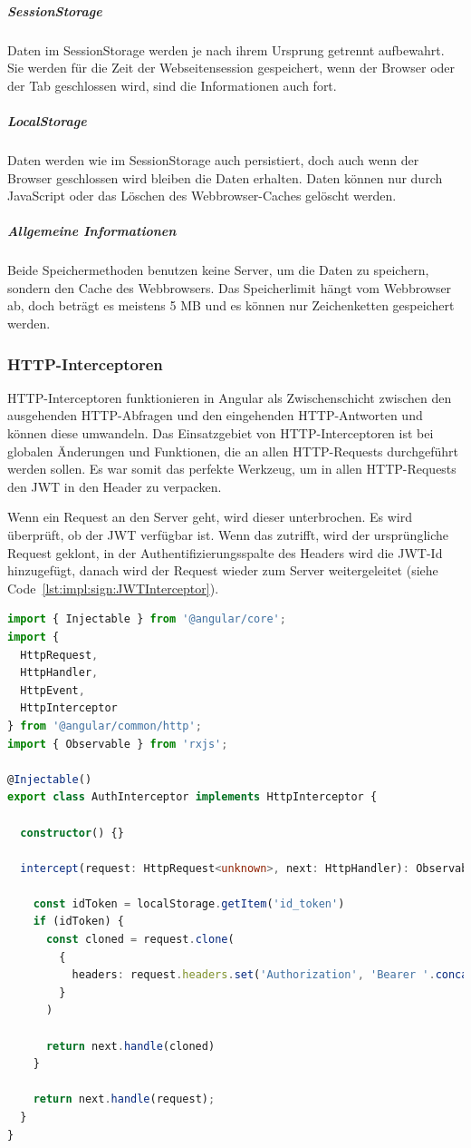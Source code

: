 \subparagraph{SessionStorage}
Daten im SessionStorage werden je nach ihrem Ursprung getrennt aufbewahrt. Sie werden für die Zeit der Webseitensession gespeichert, wenn der Browser oder der Tab geschlossen wird, sind die Informationen auch fort.
\cite{WebStorageAPI}

\subparagraph{LocalStorage}
Daten werden wie im SessionStorage auch persistiert, doch auch wenn der Browser geschlossen wird bleiben die Daten erhalten. Daten können nur durch JavaScript oder das Löschen des Webbrowser-Caches gelöscht werden.
\cite{WebStorageAPI}

\subparagraph{Allgemeine Informationen}
Beide Speichermethoden benutzen keine Server, um die Daten zu speichern, sondern den Cache des Webbrowsers. Das Speicherlimit hängt vom Webbrowser ab, doch beträgt es meistens 5 MB und es können nur Zeichenketten gespeichert werden.
\cite{WebStorageAPI}

\subsubsection{HTTP-Interceptoren}
HTTP-Interceptoren funktionieren in Angular als Zwischenschicht zwischen den ausgehenden HTTP-Abfragen und den eingehenden HTTP-Antworten und können diese umwandeln.
Das Einsatzgebiet von HTTP-Interceptoren ist bei globalen Änderungen und Funktionen, die an allen HTTP-Requests durchgeführt werden sollen. Es war somit das perfekte Werkzeug, um in allen HTTP-Requests den JWT in den Header zu verpacken.
\cite[10.3 Interceptoren: HTTP-Requests abfangen und transformieren]{AngularBuch}

Wenn ein Request an den Server geht, wird dieser unterbrochen. Es wird überprüft, ob der JWT verfügbar ist. Wenn das zutrifft, wird der ursprüngliche Request geklont, in der Authentifizierungsspalte des Headers wird die JWT-Id hinzugefügt, danach wird der Request wieder zum Server weitergeleitet (siehe Code \ref{lst:impl:sign:JWTInterceptor}). 

\begin{lstlisting}[caption=auth.interceptor.ts - add JWT to Request Header,label=lst:impl:sign:JWTInterceptor,language=TypeScript]
import { Injectable } from '@angular/core';
import {
  HttpRequest,
  HttpHandler,
  HttpEvent,
  HttpInterceptor
} from '@angular/common/http';
import { Observable } from 'rxjs';

@Injectable()
export class AuthInterceptor implements HttpInterceptor {

  constructor() {}

  intercept(request: HttpRequest<unknown>, next: HttpHandler): Observable<HttpEvent<unknown>> {

    const idToken = localStorage.getItem('id_token')
    if (idToken) {
      const cloned = request.clone(
        {
          headers: request.headers.set('Authorization', 'Bearer '.concat(idToken))
        }
      )

      return next.handle(cloned)
    }

    return next.handle(request);
  }
}
\end{lstlisting}

